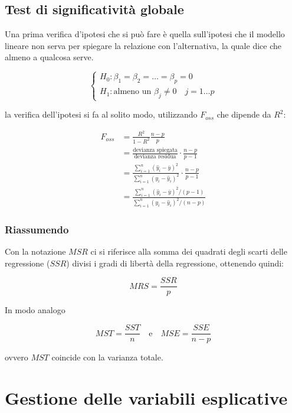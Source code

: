 \subsection{Test di significatività globale}

Una prima verifica d'ipotesi che si può fare è quella sull'ipotesi che il modello lineare non serva per spiegare la relazione con l'alternativa, la quale dice che almeno a qualcosa serve.

$$
\begin{cases}
H_0 : \beta_1 = \beta_2 = \ldots = \beta_p = 0 \\
H_1 : \text{almeno un }\beta_j \neq 0 \quad j = 1 \ldots p
\end{cases}
$$

la verifica dell'ipotesi si fa al solito modo, utilizzando $ F_{oss} $ che dipende da $ R^2 $:

\begin{align*}
F_{oss} &= \frac{R^2}{1-R^2} \frac{n - p}{p} \\
			 &= \frac{\text{devianza spiegata}}{\text{devianza residua}} \cdot \frac{n - p}{p-1} \\
			 &= \frac{\sum_{i=1}^{n} (\hat{y}_i - \bar{y})^2}{\sum_{i=1}^{n} (y_i - \hat{y}_i)^2} \cdot \frac{n - p}{p -1} \\
			 &= \frac{\sum_{i=1}^{n} (\hat{y}_i - \bar{y})^2 \big/ (p-1)}{\sum_{i=1}^{n} (y_i - \hat{y}_i)^2 \big/(n-p)}
\end{align*}

\subsubsection{Riassumendo}

Con la notazione $ MSR $ ci si riferisce alla somma dei quadrati degli scarti delle regressione ($ SSR $) divisi i gradi di libertà della regressione, ottenendo quindi:

$$
MRS = \frac{SSR}{p}
$$

In modo analogo 

$$
MST = \frac{SST}{n} \quad \text{e} \quad MSE = \frac{SSE}{n-p}
$$

ovvero $ MST $ coincide con la varianza totale.



\section{Gestione delle variabili esplicative}

